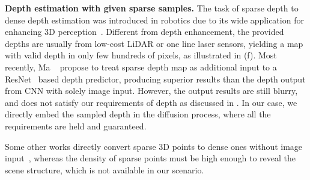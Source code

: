 \noindent\textbf{Depth estimation with given sparse samples.}
The task of sparse depth to dense depth estimation was introduced in robotics due to its wide application for enhancing 3D perception~\cite{LiaoHWKYL16}. Different from depth enhancement, the provided depths are usually from low-cost LiDAR or one line laser sensors, yielding a map with valid depth in only few hundreds of pixels, as illustrated in (f). 
Most recently, Ma \etal~\cite{Ma2017SparseToDense} propose to treat sparse depth map as additional input to a ResNet~\cite{laina2016deeper} based depth predictor, producing superior results than the depth output from CNN with solely image input. However, the output results are still blurry, and does not satisfy our requirements of depth as discussed in . In our case, we directly embed the sampled depth in the diffusion process, where all the requirements are held and guaranteed.

Some other works directly convert sparse 3D points to dense ones without image input~\cite{Zimmermann2017Learning,Ladicky_2017_ICCV,uhrig2017sparsity}, whereas the density of sparse points must be high enough to reveal the scene structure, which is not available in our scenario.